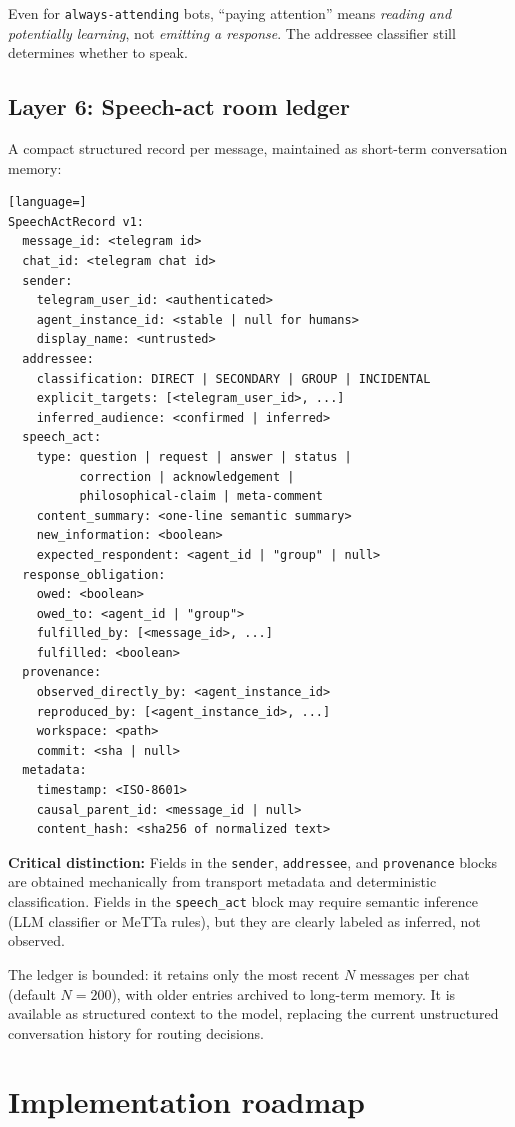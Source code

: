 \documentclass[11pt]{article}
\begin{document}
Even for \texttt{always-attending} bots, ``paying attention'' means
\emph{reading and potentially learning}, not \emph{emitting a response}.  The
addressee classifier still determines whether to speak.

\subsection{Layer 6: Speech-act room ledger}

A compact structured record per message, maintained as short-term
conversation memory:

\begin{lstlisting}[language=]
SpeechActRecord v1:
  message_id: <telegram id>
  chat_id: <telegram chat id>
  sender:
    telegram_user_id: <authenticated>
    agent_instance_id: <stable | null for humans>
    display_name: <untrusted>
  addressee:
    classification: DIRECT | SECONDARY | GROUP | INCIDENTAL
    explicit_targets: [<telegram_user_id>, ...]
    inferred_audience: <confirmed | inferred>
  speech_act:
    type: question | request | answer | status |
          correction | acknowledgement |
          philosophical-claim | meta-comment
    content_summary: <one-line semantic summary>
    new_information: <boolean>
    expected_respondent: <agent_id | "group" | null>
  response_obligation:
    owed: <boolean>
    owed_to: <agent_id | "group">
    fulfilled_by: [<message_id>, ...]
    fulfilled: <boolean>
  provenance:
    observed_directly_by: <agent_instance_id>
    reproduced_by: [<agent_instance_id>, ...]
    workspace: <path>
    commit: <sha | null>
  metadata:
    timestamp: <ISO-8601>
    causal_parent_id: <message_id | null>
    content_hash: <sha256 of normalized text>
\end{lstlisting}

\textbf{Critical distinction:} Fields in the \texttt{sender}, \texttt{addressee},
and \texttt{provenance} blocks are obtained mechanically from transport metadata
and deterministic classification.  Fields in the \texttt{speech\_act} block may
require semantic inference (LLM classifier or MeTTa rules), but they are
clearly labeled as inferred, not observed.

The ledger is bounded: it retains only the most recent $N$ messages per chat
(default $N=200$), with older entries archived to long-term memory.  It is
available as structured context to the model, replacing the current
unstructured conversation history for routing decisions.

\section{Implementation roadmap}
\end{document}
